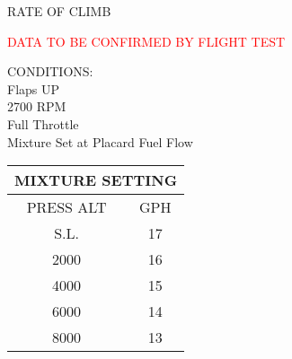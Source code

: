 \begin{figure}[t]
\begin{center}
\begin{perfhdr}RATE OF CLIMB
\end{perfhdr}
\Large
\textcolor{red}{DATA TO BE CONFIRMED BY FLIGHT TEST}\normalsize \\
\vspace{5ex}
\begin{minipage}{4in}
  \begin{flushleft}
    CONDITIONS:\\
    Flaps UP\\
    2700 RPM\\
    Full Throttle\\
    Mixture Set at Placard Fuel Flow
    \end{flushleft}
  \end{minipage}
\hfill
\begin{minipage}{1.5in}
  \begin{tabular}{|c|c|}
    \hline
    \multicolumn{2}{|c|}{MIXTURE SETTING}\\
    \hline
    PRESS ALT&GPH\\
    \hline
    S.L.&17\\
    2000&16\\
    4000&15\\
    6000&14\\
    8000&13\\
    \hline
    \end{tabular}
  \end{minipage}
\\
\vspace{\perfnoteskip}

\settowidth{\colOne}{WEIGHT}
\settowidth{\colTwo}{PRESSURE}
\settowidth{\colThree}{CLIMB}
\settowidth{\colFour}{-20\textdegree C}
\settowidth{\colFive}{9,999}
\settowidth{\colSix}{9,999}
\settowidth{\colSeven}{9,999}


\end{center}
\end{figure}

